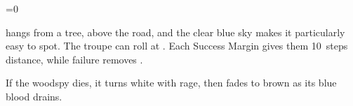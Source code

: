\ifnum\value{cycle}=0

 hangs from a tree, above the road, and the clear blue sky makes it particularly easy to spot.
The troupe can roll  at \tn[10].
Each Success Margin gives them 10~\glspl{step} distance, while failure removes .

\woodspy

If the \gls{woodspy} dies, it turns white with rage, then fades to brown as its blue blood drains.

\fi

